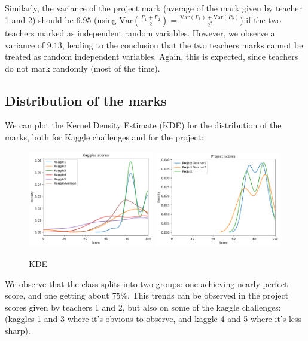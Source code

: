 \documentclass[a4paper]{article}
\newcommand{\Var}[1]{\text{Var}\left( {#1} \right)}
\begin{document}
	Similarly, the variance of the project mark (average of the mark given by teacher 1 and 2) should be $6.95$ (using $\Var{\frac{P_1 + P_2}{2}} = \frac{\Var{P_1} + \Var{P_2}}{2^2}$) if the two teachers marked as independent random variables.
	However, we observe a variance of $9.13$, leading to the conclusion that the two teachers marks cannot be treated as random independent variables.
	Again, this is expected, since teachers do not mark randomly (most of the time).
	
	\subsection{Distribution of the marks}
	We can plot the Kernel Density Estimate (KDE) for the distribution of the marks, both for Kaggle challenges and for the project:
	\begin{figure}[H]
		\centering
		\includegraphics[width=0.49\textwidth]{figures/kaggles_densities.pdf}
		\includegraphics[width=0.49\textwidth]{figures/project_densities.pdf}
		\caption{KDE}
		\label{fig:KDE}
	\end{figure}
	We observe that the class splits into two groups: one achieving nearly perfect score, and one getting about $75\%$.
	This trends can be observed in the project scores given by teachers 1 and 2, but also on some of the kaggle challenges: (kaggles 1 and 3 where it's obvious to observe, and kaggle 4 and 5 where it's less sharp).
	
\end{document}
